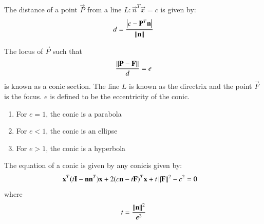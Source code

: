 \begin{lemma}
    \label{conics/30/lemma}
    The distance of a point $\vec{P}$ from a line $L: \vec{n}^T\vec{x}=c$ is given by:
    \begin{align}
    d = \frac{\left\vert c-\mathbf{P}^T\mathbf{n}\right\vert}{\left\lVert\mathbf{n}\right\rVert}   
    \end{align}
    \end{lemma}
    
\begin{definition}
\label{conics/30/def}
The locus of $\vec{P}$ such that 
\begin{align}
\frac{\left\lVert\mathbf{P}-\mathbf{F}\right\rVert}{d} = e    
\end{align}
is known as a conic section. The line $L$ is known as the directrix and the point $\vec{F}$ is the focus. $e$ is defined to be 
the eccentricity of the conic.  
\begin{enumerate}
    \item For $e = 1$, the conic is a parabola
    \item For $e < 1$, the conic is an ellipse
    \item For $e > 1$, the conic is a hyperbola
\end{enumerate}
\end{definition}

\begin{theorem}
The equation of  a conic is given by any conicis given by:
\begin{align}
\mathbf{x}^T(t\mathbf{I}-\mathbf{n}\mathbf{n}^T)\mathbf{x}+2(c\mathbf{n}-t\mathbf{F})^T\mathbf{x}+t\left\lVert\mathbf{F}\right\rVert^2-c^2&=0
\end{align}
%
where
\begin{align}
    t=\frac{\left\lVert\mathbf{n}\right\rVert^2}{e^2}
\end{align}
\end{theorem}

